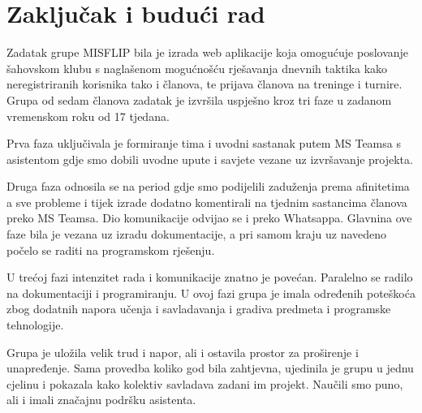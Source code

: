 \chapter{Zaključak i budući rad}
		
		Zadatak grupe MISFLIP bila je izrada web aplikacije koja omogućuje poslovanje šahovskom klubu s naglašenom mogućnošću rješavanja dnevnih taktika kako neregistriranih korisnika tako i članova, te prijava članova na treninge i turnire. Grupa od sedam članova zadatak je izvršila uspješno kroz tri faze u zadanom vremenskom roku od 17 tjedana.
		
		Prva faza uključivala je formiranje tima i uvodni sastanak putem MS Teamsa s asistentom gdje smo dobili uvodne upute i savjete vezane uz izvršavanje projekta.
		
		Druga faza odnosila se na period gdje smo podijelili zaduženja prema afinitetima a sve probleme i tijek izrade dodatno komentirali na tjednim sastancima članova preko MS Teamsa. Dio komunikacije odvijao se i preko Whatsappa. Glavnina ove faze bila je vezana uz izradu dokumentacije, a pri samom kraju uz navedeno počelo se raditi na programskom rješenju.
		
		U trećoj fazi intenzitet rada i komunikacije znatno je povećan. Paralelno se radilo na dokumentaciji i programiranju. U ovoj fazi grupa je imala određenih poteškoća zbog dodatnih napora učenja i savladavanja i gradiva predmeta i programske tehnologije.
		
		Grupa je uložila velik trud i napor, ali i ostavila prostor za proširenje i unapređenje. Sama provedba koliko god bila zahtjevna, ujedinila je grupu u jednu cjelinu i pokazala kako kolektiv savladava zadani im projekt. Naučili smo puno, ali i imali značajnu podršku asistenta.
		
		
		\eject 